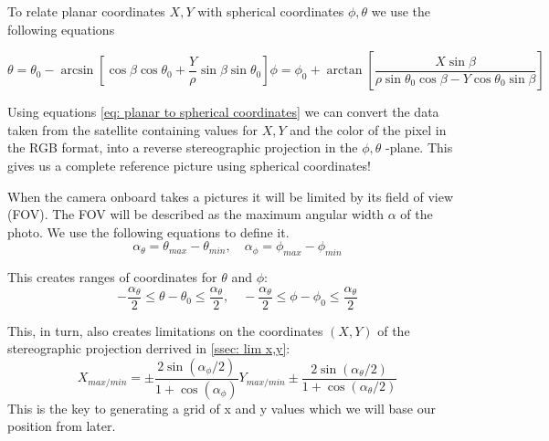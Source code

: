 \documentclass[reprint,english,notitlepage]{revtex4-2}
\begin{document}
To relate planar coordinates $ X,Y $ with spherical coordinates $ ϕ, θ $ we use the following equations 

\begin{subequations} \label{eq: planar to spherical coordinates}
	\begin{equation}
	  \theta = \theta_0 - \arcsin \left[ \cos β \cos θ _{0} + \frac{Y}{\rho} \sin β \sin θ _{0}\right] 
	\end{equation}
	\begin{equation}
	  \phi = \phi _{0} + \arctan \left[ \frac{X \sin \beta}{\rho \sin \theta _{0} \cos \beta - Y \cos  \theta _{0} \sin  \beta} \right] 
	\end{equation}
  \end{subequations}


Using equations \ref{eq: planar to spherical coordinates} we can convert the data taken from the satellite containing values for $ X,Y  $ and the color of the pixel in the RGB format, into a reverse stereographic projection in the $ ϕ, θ $ -plane. This gives us a complete reference picture using spherical coordinates!

When the camera onboard takes a pictures it will be limited by its field of view (FOV). The FOV will be described as the maximum angular width $ \alpha $ of the photo. We use the following equations to define it. 
\begin{equation} \label{eq: max angular width}
	α _{\theta} = θ _{max} - \theta _{min}, \quad α _{\phi} = ϕ _{max} - ϕ _{min}
\end{equation}

This creates ranges of coordinates for $\theta$ and $\phi$:
\begin{equation}\label{eq: limitations phi and theta}
  - \frac{\alpha _{\theta}}{2} \le θ - θ _{0} \le \frac{\alpha _{\theta }}{2}, \quad - \frac{\alpha _{\theta}}{2} \le ϕ  - ϕ _{0} \le \frac{\alpha _{\theta }}{2}
\end{equation}

This, in turn, also creates limitations on the coordinates $ (X,Y) $ of the stereographic projection derrived in \ref{ssec: lim x,y}: 
\begin{subequations} \label{eq: limitations X and Y lim}
	\begin{equation}
		X _{max / min} = ± \frac{2 \sin (α _{\phi} / 2)}{1 + \cos (\alpha _{\phi})}
	  \end{equation}
	  
	  
	\begin{equation}
		Y _{max / min} ± \frac{2 \sin (\alpha _{\theta}  / 2)}{1 + \cos (α _{\theta}/2)}
	\end{equation}
	
\end{subequations}
This is the key to generating a grid of x and y values which we will base our position from later. 
\end{document}
